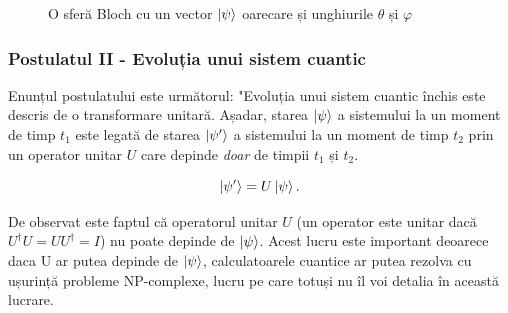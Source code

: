 \begin{figure}[H]
\centering
    \caption{O sferă Bloch cu un vector $\ket{\psi}$ oarecare și unghiurile $\theta$ și $\varphi$}
    \label{fig:BlochOarecare}
\end{figure}

\subsubsection{\textbf{Postulatul II} - Evoluția unui sistem cuantic}

Enunțul postulatului este următorul: "Evoluția unui sistem cuantic închis este descris de o transformare unitară. Așadar, starea $\ket{\psi}$ a sistemului la un moment de timp $t_1$ este legată de starea $\ket{\psi'}$ a sistemului la un moment de timp $t_2$ prin un operator unitar $U$ care depinde \textit{doar} de timpii $t_1$ și $t_2$.

\[
\ket{\psi'} = U\ket{\psi}. 
\]

De observat este faptul că operatorul unitar $U$ (un operator este unitar dacă $U^\dagger U = UU^\dagger = I$) nu poate depinde de $\ket{\psi}$. Acest lucru este important deoarece daca U ar putea depinde de $\ket{\psi}$, calculatoarele cuantice ar putea rezolva cu ușurință probleme NP-complexe, lucru pe care totuși nu îl voi detalia în această lucrare. 

